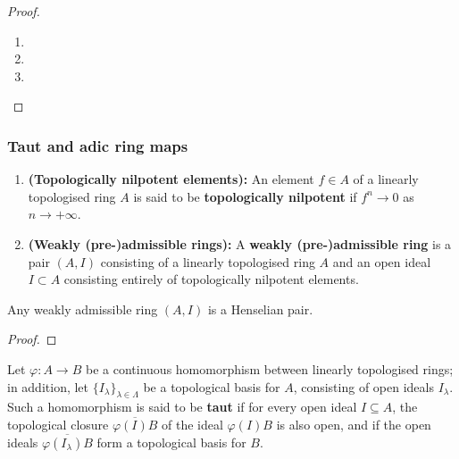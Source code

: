                 \begin{proof}
                    \noindent
                    \begin{enumerate}
                        \item 
                        \item 
                        \item 
                    \end{enumerate}
                \end{proof}
        
        \subsubsection{Taut and adic ring maps}
            \begin{definition} \label{def: weakly_pre_admissible_rings}
                \noindent
                \begin{enumerate}
                    \item \textbf{(Topologically nilpotent elements):} An element $f \in A$ of a linearly topologised ring $A$ is said to be \textbf{topologically nilpotent} if $f^n \to 0$ as $n \to +\infty$. 
                    \item \textbf{(Weakly (pre-)admissible rings):} A \textbf{weakly (pre-)admissible ring} is a pair $(A, I)$ consisting of a linearly topologised ring $A$ and an open ideal $I \subset A$ consisting entirely of topologically nilpotent elements. 
                \end{enumerate}
            \end{definition}
            \begin{proposition} \label{prop: weakly_admissible_rings_induce_henselian_pairs}
                Any weakly admissible ring $(A, I)$ is a Henselian pair.
            \end{proposition}
                \begin{proof}
                    
                \end{proof}
        
            \begin{definition} \label{def: taut_ring_maps}
                Let $\varphi: A \to B$ be a continuous homomorphism between linearly topologised rings; in addition, let $\{I_{\lambda}\}_{\lambda \in \Lambda}$ be a topological basis for $A$, consisting of open ideals $I_{\lambda}$. Such a homomorphism is said to be \textbf{taut} if for every open ideal $I \subseteq A$, the topological closure $\overline{\varphi(I)B}$ of the ideal $\varphi(I)B$ is also open, and if the open ideals $\overline{\varphi(I_{\lambda})B}$ form a topological basis for $B$.
            \end{definition}
        
